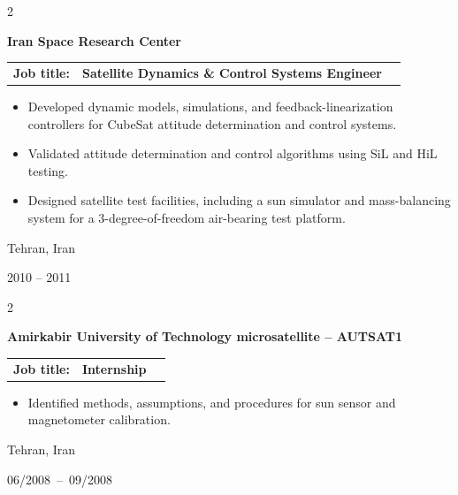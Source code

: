 \documentclass[10pt, letterpaper]{article}
\newenvironment{highlights}{
    \begin{itemize}[
        topsep=0.10 cm,
        parsep=0.10 cm,
        partopsep=0pt,
        itemsep=0pt,
        leftmargin=0.2 cm + 10pt
    ]
}{
    \end{itemize}
} %
\newenvironment{twocolentry}[2][]{
    \onecolentry
    \def\secondColumn{#2}
    \setcolumnwidth{\fill, 2.8 cm}
    \begin{paracol}{2}
}{
    \switchcolumn \raggedleft \secondColumn
    \end{paracol}
    \endonecolentry
} %
\begin{document}
        \begin{twocolentry}{
            Tehran, Iran

        2010 – 2011
        }
            \textbf{\Large{Iran Space Research Center}} \\
\vspace{-.6em}

            \begin{tabular}{ l l l }
            \textbf{Job title:} &  \textbf{Satellite Dynamics \& Control Systems Engineer} \\  
            \end{tabular}
    
            \begin{highlights}
                \item Developed dynamic models, simulations, and feedback-linearization controllers for CubeSat attitude determination and control systems.
                \item Validated attitude determination and control algorithms using SiL and HiL testing.
                \item Designed satellite test facilities, including a sun simulator and mass-balancing system for a 3-degree-of-freedom air-bearing test platform.
            \end{highlights}
        \end{twocolentry}

        \vspace{.2 cm}
        \begin{twocolentry}{
            Tehran, Iran

        06/2008~–~09/2008
        }
            \textbf{\Large{Amirkabir University of Technology microsatellite -- AUTSAT1}} \\
\vspace{-.6em}

            \begin{tabular}{ l l l }
            \textbf{Job title:} &  \textbf{Internship}	 \\  
            \end{tabular}
    
            \begin{highlights}
                \item Identified methods, assumptions, and procedures for sun sensor and magnetometer calibration. %
            \end{highlights}
        \end{twocolentry}
        
\end{document}
